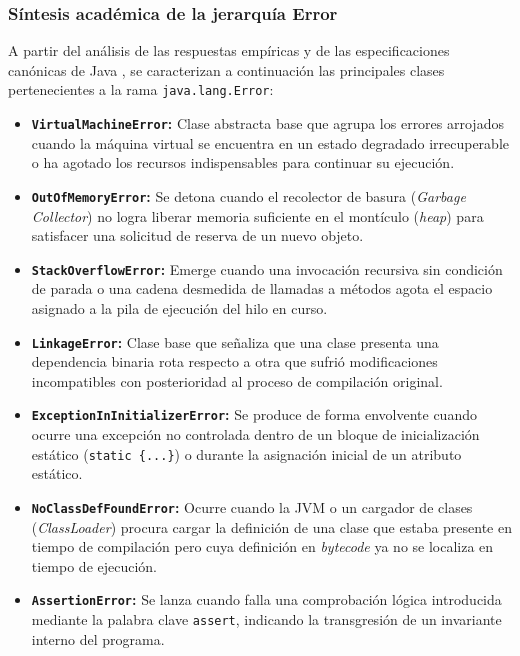 \documentclass[letterpaper,12pt,oneside]{article}
\numberwithin{figure}{section}
\begin{document}
\subsubsection{Síntesis académica de la jerarquía Error}
A partir del análisis de las respuestas empíricas y de las especificaciones canónicas de Java \cite{gosling2023,lindholm2023}, se caracterizan a continuación las principales clases pertenecientes a la rama \texttt{java.lang.Error}:
\begin{itemize}
  \item \textbf{\texttt{VirtualMachineError}:} Clase abstracta base que agrupa los errores arrojados cuando la máquina virtual se encuentra en un estado degradado irrecuperable o ha agotado los recursos indispensables para continuar su ejecución.
  \item \textbf{\texttt{OutOfMemoryError}:} Se detona cuando el recolector de basura (\textit{Garbage Collector}) no logra liberar memoria suficiente en el montículo (\textit{heap}) para satisfacer una solicitud de reserva de un nuevo objeto.
  \item \textbf{\texttt{StackOverflowError}:} Emerge cuando una invocación recursiva sin condición de parada o una cadena desmedida de llamadas a métodos agota el espacio asignado a la pila de ejecución del hilo en curso.
  \item \textbf{\texttt{LinkageError}:} Clase base que señaliza que una clase presenta una dependencia binaria rota respecto a otra que sufrió modificaciones incompatibles con posterioridad al proceso de compilación original.
  \item \textbf{\texttt{ExceptionInInitializerError}:} Se produce de forma envolvente cuando ocurre una excepción no controlada dentro de un bloque de inicialización estático (\texttt{static \{...\}}) o durante la asignación inicial de un atributo estático.
  \item \textbf{\texttt{NoClassDefFoundError}:} Ocurre cuando la JVM o un cargador de clases (\textit{ClassLoader}) procura cargar la definición de una clase que estaba presente en tiempo de compilación pero cuya definición en \textit{bytecode} ya no se localiza en tiempo de ejecución.
  \item \textbf{\texttt{AssertionError}:} Se lanza cuando falla una comprobación lógica introducida mediante la palabra clave \texttt{assert}, indicando la transgresión de un invariante interno del programa.
\end{itemize}
\end{document}
